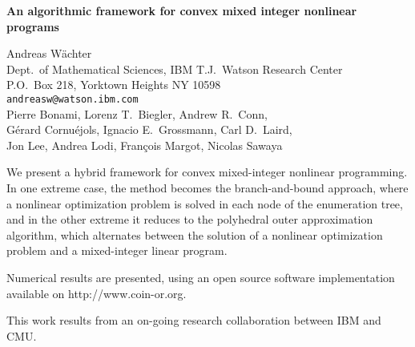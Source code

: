 \documentclass{report}
\begin{document}

\begin{center}
{\large
{\bf An algorithmic framework for convex mixed integer nonlinear programs}}

	Andreas W\"achter \\
	Dept.~of Mathematical Sciences, IBM T.J.~Watson Research Center \\
	P.O.~Box 218, Yorktown Heights NY 10598 \\
	{\tt andreasw@watson.ibm.com} \\
	Pierre Bonami, Lorenz T.~Biegler, Andrew R.~Conn, \\
	G\'erard Cornu\'ejols, Ignacio E.~Grossmann, Carl D.~Laird, \\
	Jon Lee, Andrea Lodi, Fran\c{c}ois Margot, Nicolas Sawaya
\end{center}
We present a hybrid framework for convex mixed-integer
nonlinear programming. In one extreme case, the method
becomes the branch-and-bound approach, where a nonlinear
optimization problem is solved in each node of the
enumeration tree, and in the other extreme it reduces to the
polyhedral outer approximation algorithm, which alternates
between the solution of a nonlinear optimization problem and
a mixed-integer linear program.

Numerical results are
presented, using an open source software implementation
available on http://www.coin-or.org.

This work results
from an on-going research collaboration between IBM and CMU.



\end{document}
